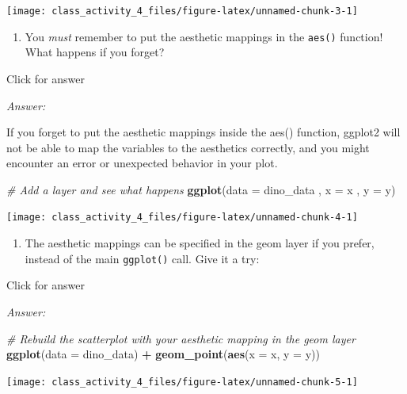 \documentclass[
]{book}
\newenvironment{Shaded}{\begin{snugshade}}{\end{snugshade}}
\newcommand{\AttributeTok}[1]{\textcolor[rgb]{0.13,0.29,0.53}{#1}}
\newcommand{\CommentTok}[1]{\textcolor[rgb]{0.56,0.35,0.01}{\textit{#1}}}
\newcommand{\FunctionTok}[1]{\textcolor[rgb]{0.13,0.29,0.53}{\textbf{#1}}}
\newcommand{\NormalTok}[1]{#1}
\newcommand{\SpecialCharTok}[1]{\textcolor[rgb]{0.81,0.36,0.00}{\textbf{#1}}}
\providecommand{\tightlist}{%
  \setlength{\itemsep}{0pt}\setlength{\parskip}{0pt}}
\begin{document}
\texttt{[image: class\_activity\_4\_files/figure-latex/unnamed-chunk-3-1]}

\begin{enumerate}
\def\labelenumi{\alph{enumi}.}
\setcounter{enumi}{1}
\tightlist
\item
  You \emph{must} remember to put the aesthetic mappings in the \texttt{aes()} function! What happens if you forget?
\end{enumerate}

Click for answer

\emph{Answer:}

If you forget to put the aesthetic mappings inside the aes() function, ggplot2 will not be able to map the variables to the aesthetics correctly, and you might encounter an error or unexpected behavior in your plot.

\begin{Shaded}
\begin{Highlighting}[]
\CommentTok{\# Add a layer and see what happens}
\FunctionTok{ggplot}\NormalTok{(}\AttributeTok{data =}\NormalTok{ dino\_data , }\AttributeTok{x =}\NormalTok{ x , }\AttributeTok{y =}\NormalTok{ y)}
\end{Highlighting}
\end{Shaded}

\texttt{[image: class\_activity\_4\_files/figure-latex/unnamed-chunk-4-1]}

\begin{enumerate}
\def\labelenumi{\alph{enumi}.}
\setcounter{enumi}{2}
\tightlist
\item
  The aesthetic mappings can be specified in the geom layer if you prefer, instead of the main \texttt{ggplot()} call. Give it a try:
\end{enumerate}

Click for answer

\emph{Answer:}

\begin{Shaded}
\begin{Highlighting}[]
\CommentTok{\# Rebuild the scatterplot with your aesthetic mapping in the geom layer}
\FunctionTok{ggplot}\NormalTok{(}\AttributeTok{data =}\NormalTok{ dino\_data) }\SpecialCharTok{+}
   \FunctionTok{geom\_point}\NormalTok{(}\FunctionTok{aes}\NormalTok{(}\AttributeTok{x =}\NormalTok{ x, }\AttributeTok{y =}\NormalTok{ y)) }
\end{Highlighting}
\end{Shaded}

\texttt{[image: class\_activity\_4\_files/figure-latex/unnamed-chunk-5-1]}
\end{document}
